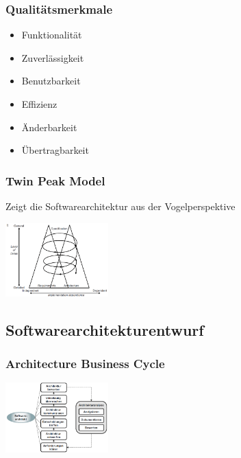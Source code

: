 \documentclass{report}
\newenvironment{Figure}
	{\par\medskip\noindent\minipage{\linewidth}}
	{\endminipage\par\medskip}
\theoremstyle{definition}
\theoremstyle{example}
\begin{document}
\subsubsection{Qualitätsmerkmale}
\begin{itemize}
   \item Funktionalität
   \item Zuverlässigkeit
   \item Benutzbarkeit
   \item Effizienz
   \item Änderbarkeit
   \item Übertragbarkeit
\end{itemize}

\subsubsection{Twin Peak Model}
Zeigt die Softwarearchitektur aus der Vogelperspektive

\begin{Figure}
   \centering
    \includegraphics[width=150px]{img/TwinPeakMOdel.png}
        \label{fig:Abbildung der Architektur aus der Vogelperspektive}
\end{Figure}

\subsection{Softwarearchitekturentwurf}

\subsubsection{Architecture Business Cycle}
\begin{Figure}
   \centering
    \includegraphics[width=150px]{img/ArchitectureBusinessCycle.png}
        \label{fig:Ablauf des Architecture Business Cycle}
\end{Figure}
\end{document}
